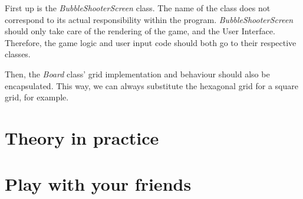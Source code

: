 \documentclass[a4paper,11pt]{article}
\begin{document}
First up is the \textit{BubbleShooterScreen} class. The name of the class does not correspond to its actual responsibility within the program. \textit{BubbleShooterScreen} should only take care of the rendering of the game, and the User Interface. Therefore, the game logic and user input code should both go to their respective classes.

Then, the \textit{Board} class' grid implementation and behaviour should also be encapsulated. This way, we can always substitute the hexagonal grid for a square grid, for example.

\section{Theory in practice}
\section{Play with your friends}
\end{document}
